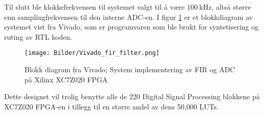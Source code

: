 Til slutt ble klokkefrekvensen til systemet valgt til å være $\SI{100}{\kilo\hertz}$, altså større enn samplingfrekvensen til den interne ADC-en.
I figur \ref{fig:vivado_fir_block_diagram} er et blokkdiagram av systemet vist fra Vivado, som er programvaren som ble brukt for syntetisering og 
ruting av RTL koden.
\begin{figure}[H]
    \centering 
    \texttt{[image: Bilder/Vivado\_fir\_filter.png]}
    \caption{Blokk diagram fra Vivado; System implementering av FIR og ADC på Xilinx XC7Z020 FPGA}
    \label{fig:vivado_fir_block_diagram}
\end{figure}

Dette designet vil trolig benytte alle de 220 Digital Signal Processing blokkene på XC7Z020 FPGA-en i tillegg til en større andel
av dens 50,000 LUTs.
